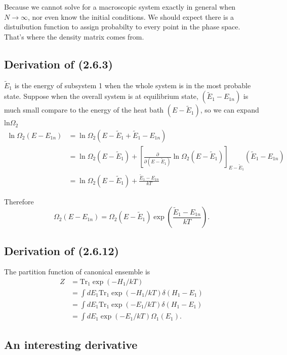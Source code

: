\documentclass[10pt]{article}
\begin{document}
	Because we cannot solve for a macroscopic system exactly in general when $N \to \infty$, nor even know the initial conditions. We should expect there is a distuibution function to assign probabilty to every point in the phase space. That's where the density matrix comes from.

	\subsection{Derivation of (2.6.3)}


	$\tilde{E}_1$ is the energy of subsystem 1 when the whole system is in the most probable state. Suppose when the overall system is at equilibrium state, $(\tilde{E}_1 - E_{1n})$ is much small compare to the energy of the heat bath $(E - \tilde{E}_1)$, so we can expand $\mathrm{ln}\Omega_2 $
	\begin{align*}
		\ln\Omega_2(E - E_{1n}) &= \ln\Omega_2(E - \tilde{E}_1 + \tilde{E}_1 - E_{1n}) \\
		&= \ln\Omega_2(E - \tilde{E}_1) + \left[\frac{\partial }{\partial(E - \tilde{E}_1)}\ln\Omega_2(E - \tilde{E}_1)\right]_{E - \tilde{E}_1}(\tilde{E}_1 - E_{1n}) \\
		&= \ln\Omega_2(E - \tilde{E}_1) + \frac{\tilde{E}_1 - E_{1n}}{kT}
	\end{align*}

	Therefore
	\begin{equation}
		\Omega_2(E - E_{1n}) = \Omega_2(E - \tilde{E}_1) \exp\left(\frac{\tilde{E}_1 - E_{1n}}{kT}\right).
	\end{equation}

	\subsection{Derivation of (2.6.12)}

	The partition function of canonical ensemble is
	\begin{align*}
		Z &= \mathrm{Tr_1}\exp(-H_1/kT) \\
		&= \int dE_1 \mathrm{Tr_1}\exp(-H_1/kT) \delta(H_1 - E_1) \\
		&= \int dE_1 \mathrm{Tr_1}\exp(-E_1/kT) \delta(H_1 - E_1) \\
		&= \int dE_1 \exp(-E_1/kT) \Omega_1(E_1).
	\end{align*}

	\subsection{An interesting derivative}
\end{document}
